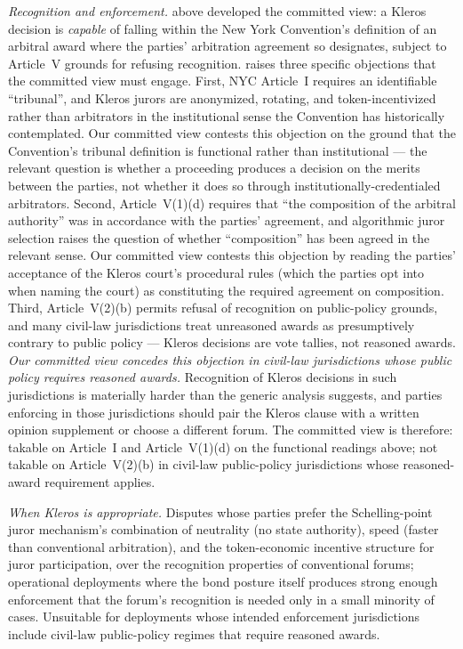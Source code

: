 \documentclass[11pt,a4paper]{article}
\theoremstyle{remark}
\begin{document}
\emph{Recognition and enforcement.} 
above developed the committed view: a Kleros decision is
\emph{capable} of falling within the New York Convention's
definition of an arbitral award where the parties' arbitration
agreement so designates, subject to Article~V grounds for
refusing recognition. \citet{ortolani2019blockchain} raises three
specific objections that the committed view must engage. First,
NYC Article~I requires an identifiable ``tribunal'', and Kleros
jurors are anonymized, rotating, and token-incentivized rather
than arbitrators in the institutional sense the Convention has
historically contemplated. Our committed view contests this
objection on the ground that the Convention's tribunal
definition is functional rather than institutional --- the
relevant question is whether a proceeding produces a decision
on the merits between the parties, not whether it does so
through institutionally-credentialed arbitrators. Second,
Article~V(1)(d) requires that ``the composition of the arbitral
authority'' was in accordance with the parties' agreement, and
algorithmic juror selection raises the question of whether
``composition'' has been agreed in the relevant sense. Our
committed view contests this objection by reading the parties'
acceptance of the Kleros court's procedural rules (which the
parties opt into when naming the court) as constituting the
required agreement on composition. Third, Article~V(2)(b)
permits refusal of recognition on public-policy grounds, and
many civil-law jurisdictions treat unreasoned awards as
presumptively contrary to public policy --- Kleros decisions
are vote tallies, not reasoned awards. \emph{Our committed view
concedes this objection in civil-law jurisdictions whose public
policy requires reasoned awards.} Recognition of Kleros
decisions in such jurisdictions is materially harder than the
generic analysis suggests, and parties enforcing in those
jurisdictions should pair the Kleros clause with a written
opinion supplement or choose a different forum. The committed
view is therefore: takable on Article~I and Article~V(1)(d) on
the functional readings above; not takable on Article~V(2)(b)
in civil-law public-policy jurisdictions whose reasoned-award
requirement applies.

\emph{When Kleros is appropriate.} Disputes whose parties prefer
the Schelling-point juror mechanism's combination of neutrality
(no state authority), speed (faster than conventional
arbitration), and the token-economic incentive structure for
juror participation, over the recognition properties of
conventional forums; operational deployments where the bond
posture itself produces strong enough enforcement that the
forum's recognition is needed only in a small minority of
cases. Unsuitable for deployments whose intended enforcement
jurisdictions include civil-law public-policy regimes that
require reasoned awards.
\end{document}
